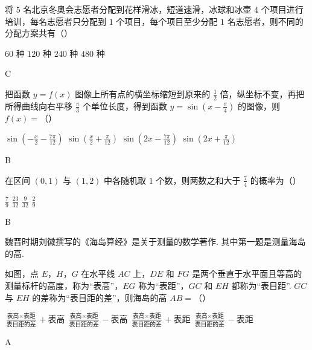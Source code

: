 \begin{problem}
将 \(5\) 名北京冬奥会志愿者分配到花样滑冰，短道速滑，冰球和冰壶 \(4\) 个项目进行培训，每名志愿者只分配到 \(1\) 个项目，每个项目至少分配 \(1\) 名志愿者，则不同的分配方案共有（\quad）

\choices
    {\(60\) 种}
    {\(120\) 种}
    {\(240\) 种}
    {\(480\) 种}

\begin{answer}
C
\end{answer}
\end{problem}

\begin{problem}
把函数 \(y=f(x)\) 图像上所有点的横坐标缩短到原来的 \(\frac{1}{2}\) 倍，纵坐标不变，再把所得曲线向右平移 \(\frac{\pi}{3}\) 个单位长度，得到函数 \(y=\sin\left( x-\frac{\pi}{4} \right)\) 的图像，则 \(f(x)=\)（\quad）

\choices
    {\(\sin\left( -\frac{x}{2}-\frac{7\pi}{12} \right)\)}
    {\(\sin\left( \frac{x}{2}+\frac{\pi}{12} \right)\)}
    {\(\sin\left( 2x-\frac{7\pi}{12} \right)\)}
    {\(\sin\left( 2x+\frac{\pi}{12} \right)\)}

\begin{answer}
B
\end{answer}
\end{problem}

\begin{problem}
在区间 \((0,1)\) 与 \((1,2)\) 中各随机取 \(1\) 个数，则两数之和大于 \(\frac{7}{4}\) 的概率为（\quad）

\choices
    {\(\frac{7}{9}\)}
    {\(\frac{23}{32}\)}
    {\(\frac{9}{32}\)}
    {\(\frac{2}{9}\)}

\begin{answer}
B
\end{answer}
\end{problem}

\begin{problem}
魏晋时期刘徽撰写的《海岛算经》是关于测量的数学著作. 其中第一题是测量海岛的高.

如图，点 \(E\)，\(H\)，\(G\) 在水平线 \(AC\) 上，\(DE\) 和 \(FG\) 是两个垂直于水平面且等高的测量标杆的高度，称为“表高”，\(EG\) 称为“表距”，\(GC\) 和 \(EH\) 都称为“表目距”. \(GC\) 与 \(EH\) 的差称为“表目距的差”，则海岛的高 \(AB=\)（\quad）


\choices
    {\(\frac{\text{表高}\times \text{表距}}{\text{表目距的差}}+\text{表高}\)}
    {\(\frac{\text{表高}\times \text{表距}}{\text{表目距的差}}-\text{表高}\)}
    {\(\frac{\text{表高}\times \text{表距}}{\text{表目距的差}}+\text{表距}\)}
    {\(\frac{\text{表高}\times \text{表距}}{\text{表目距的差}}-\text{表距}\)}

\begin{answer}
A
\end{answer}
\end{problem}

